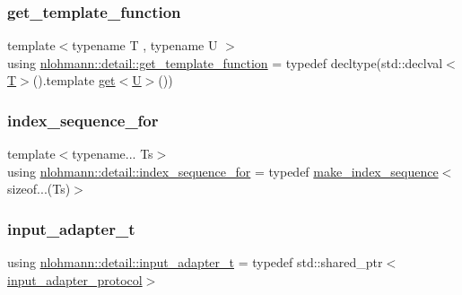 \mbox{\label{namespacenlohmann_1_1detail_ab4d22cdb6521ee3508db496dea66711e}} 
\subsubsection{\texorpdfstring{get\_template\_function}{get\_template\_function}}
{\footnotesize\ttfamily template$<$typename T , typename U $>$ \\
using \mbox{\hyperlink{namespacenlohmann_1_1detail_ab4d22cdb6521ee3508db496dea66711e}{nlohmann\+::detail\+::get\+\_\+template\+\_\+function}} = typedef decltype(std\+::declval$<$\mbox{\hyperlink{_keyboard_event_8h_adf1f3edb9115acb0a1e04209b7a9937b}{T}}$>$().template \mbox{\hyperlink{namespacenlohmann_1_1detail_acc422c11342b31368f610b6f96fcedc6}{get}}$<$\mbox{\hyperlink{_keyboard_event_8h_a81cf6107131a3583e2b0b762cb9c2862}{U}}$>$())}

\mbox{\label{namespacenlohmann_1_1detail_a24800493c6ec02ce033dcbb47b7fd28e}} 
\subsubsection{\texorpdfstring{index\_sequence\_for}{index\_sequence\_for}}
{\footnotesize\ttfamily template$<$typename... Ts$>$ \\
using \mbox{\hyperlink{namespacenlohmann_1_1detail_a24800493c6ec02ce033dcbb47b7fd28e}{nlohmann\+::detail\+::index\+\_\+sequence\+\_\+for}} = typedef \mbox{\hyperlink{structnlohmann_1_1detail_1_1make__index__sequence}{make\+\_\+index\+\_\+sequence}}$<$sizeof...(Ts)$>$}

\mbox{\label{namespacenlohmann_1_1detail_ae132f8cd5bb24c5e9b40ad0eafedf1c2}} 
\subsubsection{\texorpdfstring{input\_adapter\_t}{input\_adapter\_t}}
{\footnotesize\ttfamily using \mbox{\hyperlink{namespacenlohmann_1_1detail_ae132f8cd5bb24c5e9b40ad0eafedf1c2}{nlohmann\+::detail\+::input\+\_\+adapter\+\_\+t}} = typedef std\+::shared\+\_\+ptr$<$\mbox{\hyperlink{structnlohmann_1_1detail_1_1input__adapter__protocol}{input\+\_\+adapter\+\_\+protocol}}$>$}



